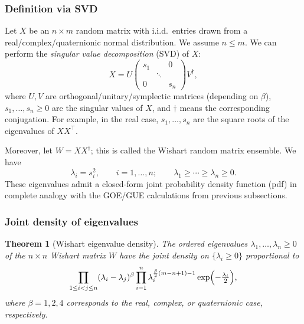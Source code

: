 \documentclass[letterpaper,11pt,oneside,reqno]{article}
\numberwithin{equation}{section}
\newtheorem{theorem}[proposition]{Theorem}
\theoremstyle{definition}
\begin{document}
\subsubsection{Definition via SVD}

Let $X$ be an $n\times m$ random matrix with i.i.d.\ entries drawn from a real/complex/quaternionic normal distribution. We assume $n \leq m$.
We can perform the \emph{singular value decomposition} (SVD) of $X$:
\[
    X = U
    \begin{pmatrix}
        s_1 &        & 0 \\
             &\ddots &    \\
         0  &        & s_n
    \end{pmatrix} 
    V^\dagger,
\]
where $U,V$ are orthogonal/unitary/symplectic matrices (depending on $\beta$), $s_1,\dots,s_n\geq 0$ are the singular values of $X$, and $\dagger$
means the corresponding conjugation.
For example, in the real case, $s_1,\ldots,s_n $ are
the square roots of the eigenvalues of $X X^\top$.

Moreover, let $W=XX^\dagger$; this is called the Wishart
random matrix ensemble. We have
\[
    \lambda_i = s_i^2,\qquad i=1,\ldots,n;
		\qquad 
		\lambda_1\ge \cdots \ge \lambda_n\ge 0.
\]
These eigenvalues admit a closed-form joint probability density function (pdf) in complete analogy with the GOE/GUE calculations from previous subsections.

\subsubsection{Joint density of eigenvalues}

\begin{theorem}[Wishart eigenvalue density]
\label{thm:Wishart-Distribution}
The ordered eigenvalues $\lambda_1,\dots,\lambda_n \geq 0$ of
the $n\times n$ Wishart matrix
$W$ have the joint density on $\{\lambda_i\geq 0\}$ proportional to
\[
    \prod_{1 \leq i < j \leq n}
    (\lambda_i - \lambda_j)^\beta
    \prod_{i=1}^n
    \lambda_i^{\frac{\beta}{2}(m - n + 1)-1}
    \exp\Bigl(-\tfrac{\lambda_i}{2}\Bigr),
\]
where $\beta=1,2,4$ corresponds to the real, complex, or
quaternionic case, respectively. 
\end{theorem}
\end{document}
